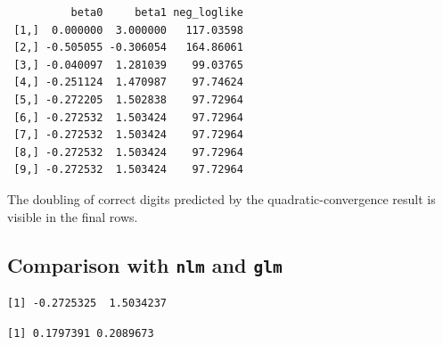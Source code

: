 \documentclass[
  letterpaper,
  DIV=11,
  numbers=noendperiod]{scrreprt}
\newenvironment{Shaded}{\begin{snugshade}}{\end{snugshade}}
\newcommand{\AttributeTok}[1]{\textcolor[rgb]{0.40,0.45,0.13}{#1}}
\newcommand{\CommentTok}[1]{\textcolor[rgb]{0.37,0.37,0.37}{#1}}
\newcommand{\ConstantTok}[1]{\textcolor[rgb]{0.56,0.35,0.01}{#1}}
\newcommand{\DecValTok}[1]{\textcolor[rgb]{0.68,0.00,0.00}{#1}}
\newcommand{\FunctionTok}[1]{\textcolor[rgb]{0.28,0.35,0.67}{#1}}
\newcommand{\NormalTok}[1]{\textcolor[rgb]{0.00,0.23,0.31}{#1}}
\newcommand{\OtherTok}[1]{\textcolor[rgb]{0.00,0.23,0.31}{#1}}
\newcommand{\SpecialCharTok}[1]{\textcolor[rgb]{0.37,0.37,0.37}{#1}}
\begin{document}
\begin{verbatim}
          beta0     beta1 neg_loglike
 [1,]  0.000000  3.000000   117.03598
 [2,] -0.505055 -0.306054   164.86061
 [3,] -0.040097  1.281039    99.03765
 [4,] -0.251124  1.470987    97.74624
 [5,] -0.272205  1.502838    97.72964
 [6,] -0.272532  1.503424    97.72964
 [7,] -0.272532  1.503424    97.72964
 [8,] -0.272532  1.503424    97.72964
 [9,] -0.272532  1.503424    97.72964
\end{verbatim}

The doubling of correct digits predicted by the quadratic-convergence
result is visible in the final rows.

\subsection{\texorpdfstring{Comparison with \texttt{nlm} and
\texttt{glm}}{Comparison with nlm and glm}}\label{comparison-with-nlm-and-glm}

\begin{Shaded}
\end{Shaded}

\begin{verbatim}
[1] -0.2725325  1.5034237
\end{verbatim}

\begin{Shaded}
\end{Shaded}

\begin{verbatim}
[1] 0.1797391 0.2089673
\end{verbatim}

\begin{Shaded}
\end{Shaded}
\end{document}
